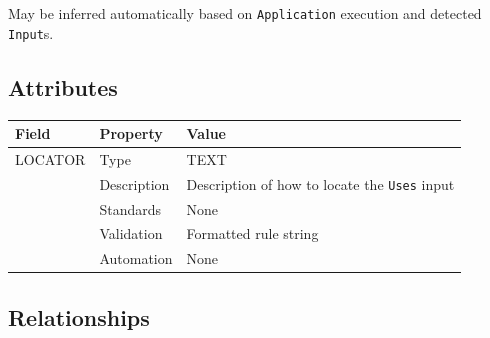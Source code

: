 \documentclass[
]{article}
\newcounter{none}
\begin{document}
May be inferred automatically based on \texttt{Application} execution
and detected \texttt{Input}s.

\subsection{Attributes}\label{attributes-32}

{\def\LTcaptype{none} 
\begin{longtable}[]{@{}lll@{}}
\toprule\noalign{}
Field & Property & Value \\
\midrule\noalign{}
\endhead
\bottomrule\noalign{}
\endlastfoot
LOCATOR & Type & TEXT \\
& Description & Description of how to locate the \texttt{Uses} input \\
& Standards & None \\
& Validation & Formatted rule string \\
& Automation & None \\
\end{longtable}
}

\subsection{Relationships}\label{relationships-31}
\end{document}
